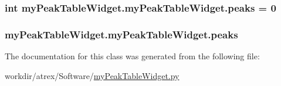\hypertarget{classmy_peak_table_widget_1_1my_peak_table_widget_a00a3801ee16f8bb1b140b254793e098c}{
\subsubsection[{peaks}]{\setlength{\rightskip}{0pt plus 5cm}int my\-Peak\-Table\-Widget.\-my\-Peak\-Table\-Widget.\-peaks = 0\hspace{0.3cm}{\ttfamily [static]}}}\label{classmy_peak_table_widget_1_1my_peak_table_widget_a00a3801ee16f8bb1b140b254793e098c}
\hypertarget{classmy_peak_table_widget_1_1my_peak_table_widget_afa4b43bf4a5bf3308bf8a7d4c146712b}{
\subsubsection[{peaks}]{\setlength{\rightskip}{0pt plus 5cm}my\-Peak\-Table\-Widget.\-my\-Peak\-Table\-Widget.\-peaks}}\label{classmy_peak_table_widget_1_1my_peak_table_widget_afa4b43bf4a5bf3308bf8a7d4c146712b}


The documentation for this class was generated from the following file\-:\begin{DoxyCompactItemize}
\item 
workdir/atrex/\-Software/\hyperlink{my_peak_table_widget_8py}{my\-Peak\-Table\-Widget.\-py}\end{DoxyCompactItemize}
